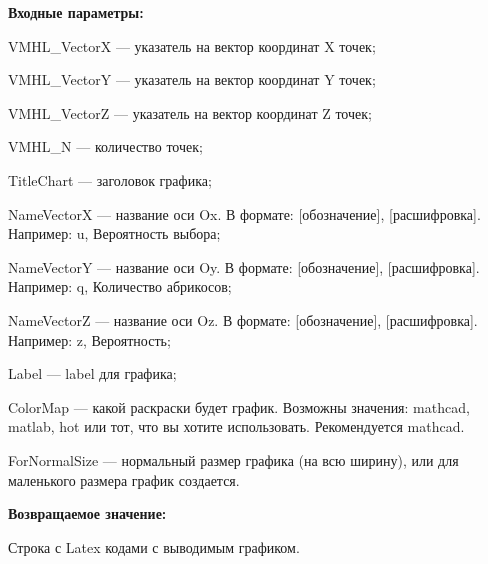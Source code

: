 \textbf{Входные параметры:}

VMHL\_VectorX --- указатель на вектор координат X точек;
 
VMHL\_VectorY --- указатель на вектор координат Y точек;
 
VMHL\_VectorZ --- указатель на вектор координат Z точек;
 
VMHL\_N --- количество точек;
 
TitleChart --- заголовок графика;
 
NameVectorX --- название оси Ox. В формате: [обозначение], [расшифровка]. Например: u, Вероятность выбора;
 
NameVectorY --- название оси Oy. В формате: [обозначение], [расшифровка]. Например: q, Количество абрикосов;
 
NameVectorZ --- название оси Oz. В формате: [обозначение], [расшифровка]. Например: z, Вероятность;
 
Label --- label для графика;
 
ColorMap --- какой раскраски будет график. Возможны значения: mathcad, matlab, hot или тот, что вы хотите использовать. Рекомендуется mathcad.
 
ForNormalSize --- нормальный размер графика (на всю ширину), или для маленького размера график создается.
	
\textbf{Возвращаемое значение:}

Строка с Latex кодами с выводимым графиком.
